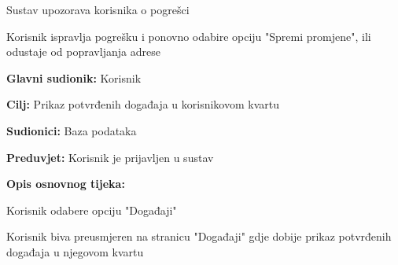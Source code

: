 \begin{packed_item}
\begin{packed_item}
\begin{packed_enum}
                                \item Sustav upozorava korisnika o pogrešci
                                \item Korisnik ispravlja pogrešku i ponovno odabire opciju "Spremi promjene", ili odustaje od popravljanja adrese
                                
                            \end{packed_enum}
                            
                        \end{packed_item}
                    \end{packed_item}					
					

					\noindent {}
					\begin{packed_item}
	
						\item \textbf{Glavni sudionik: }Korisnik
						\item  \textbf{Cilj:} Prikaz potvrđenih događaja u korisnikovom kvartu
						\item  \textbf{Sudionici:} Baza podataka
						\item  \textbf{Preduvjet:} Korisnik je prijavljen u sustav
						\item  \textbf{Opis osnovnog tijeka:}
						
						\item[] \begin{packed_enum}
	
							\item Korisnik odabere opciju "Događaji"
							\item Korisnik biva preusmjeren na stranicu "Događaji" gdje dobije prikaz potvrđenih događaja u njegovom kvartu
						\end{packed_enum}
						
							
						\end{packed_item}
					\noindent {}
